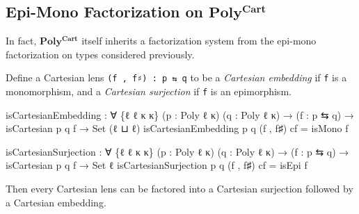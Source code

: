 \documentclass[
  11pt,
  oneside,
  article]{memoir}
\newenvironment{Shaded}{}{}
\newcommand{\DataTypeTok}[1]{\textcolor[rgb]{0.56,0.13,0.00}{#1}}
\newcommand{\NormalTok}[1]{#1}
\newcommand{\OtherTok}[1]{\textcolor[rgb]{0.00,0.44,0.13}{#1}}
\theoremstyle{definition}
\theoremstyle{plain}
\newcommand{\0}{\textsf{0}}
\newcommand{\1}{\tn{\textsf{1}}}
\begin{document}
\subsection{\texorpdfstring{Epi-Mono Factorization on
\(\mathbf{Poly^{Cart}}\)}{Epi-Mono Factorization on \textbackslash mathbf\{Poly\^{}\{Cart\}\}}}\label{epi-mono-factorization-on-mathbfpolycart}

In fact, \(\mathbf{Poly^{Cart}}\) itself inherits a factorization system
from the epi-mono factorization on types considered previously.

Define a Cartesian lens \texttt{(f\ ,\ f♯)\ :\ p\ ⇆\ q} to be a
\emph{Cartesian embedding} if \texttt{f} is a monomorphism, and a
\emph{Cartesian surjection} if \texttt{f} is an epimorphism.

\begin{Shaded}
\begin{Highlighting}[]
\NormalTok{isCartesianEmbedding }\OtherTok{:} \OtherTok{∀} \OtherTok{\{}\NormalTok{ℓ ℓ\textquotesingle{} κ κ\textquotesingle{}}\OtherTok{\}} \OtherTok{(}\NormalTok{p }\OtherTok{:}\NormalTok{ Poly ℓ κ}\OtherTok{)} \OtherTok{(}\NormalTok{q }\OtherTok{:}\NormalTok{ Poly ℓ\textquotesingle{} κ\textquotesingle{}}\OtherTok{)}
                       \OtherTok{→} \OtherTok{(}\NormalTok{f }\OtherTok{:}\NormalTok{ p ⇆ q}\OtherTok{)} \OtherTok{→}\NormalTok{ isCartesian p q f }\OtherTok{→} \DataTypeTok{Set} \OtherTok{(}\NormalTok{ℓ ⊔ ℓ\textquotesingle{}}\OtherTok{)}
\NormalTok{isCartesianEmbedding p q }\OtherTok{(}\NormalTok{f , f♯}\OtherTok{)}\NormalTok{ cf }\OtherTok{=}\NormalTok{ isMono f}

\NormalTok{isCartesianSurjection }\OtherTok{:} \OtherTok{∀} \OtherTok{\{}\NormalTok{ℓ ℓ\textquotesingle{} κ κ\textquotesingle{}}\OtherTok{\}} \OtherTok{(}\NormalTok{p }\OtherTok{:}\NormalTok{ Poly ℓ κ}\OtherTok{)} \OtherTok{(}\NormalTok{q }\OtherTok{:}\NormalTok{ Poly ℓ\textquotesingle{} κ\textquotesingle{}}\OtherTok{)}
                        \OtherTok{→} \OtherTok{(}\NormalTok{f }\OtherTok{:}\NormalTok{ p ⇆ q}\OtherTok{)} \OtherTok{→}\NormalTok{ isCartesian p q f }\OtherTok{→} \DataTypeTok{Set}\NormalTok{ ℓ\textquotesingle{}}
\NormalTok{isCartesianSurjection p q }\OtherTok{(}\NormalTok{f , f♯}\OtherTok{)}\NormalTok{ cf }\OtherTok{=}\NormalTok{ isEpi f}
\end{Highlighting}
\end{Shaded}

Then every Cartesian lens can be factored into a Cartesian surjection
followed by a Cartesian embedding.
\end{document}
